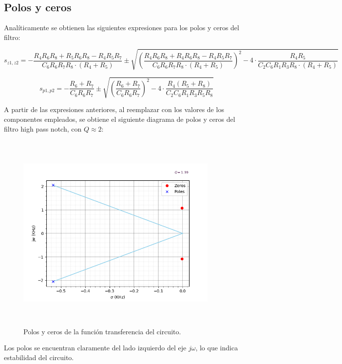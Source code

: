 \subsection{Polos y ceros}

Anal\'iticamente se obtienen las siguientes expresiones para los polos y ceros del filtro:

\begin{equation}
s_{z1,z2} = - \frac{R_4  R_6  R_8+R_5  R_6  R_8 - R_4 R_5 R_7}{C_6 R_6 R_7 R_8 \cdot (R_4 + R_5)} \pm \sqrt{\left( \frac{R_4 R_6 R_8 + R_4 R_6 R_8 - R_4 R_5 R_7}{C_6 R_6 R_7 R_8 \cdot (R_4 + R_5)}\right)^2- 4 \cdot \frac{R_4 R_5}{C_2 C_6 R_1 R_3 R_8 \cdot (R_4 + R_5)}}
\label{ceros}
\end{equation}

\begin{equation}
s_{p1,p2} = - \frac{R_6 + R_7}{C_6 R_6 R_7} \pm \sqrt{\left( \frac{R_6 + R_7}{C_6 R_6 R_7}\right)^2 - 4 \cdot \frac{R_4(R_5+R_8)}{C_2 C_6 R_1 R_3 R_5 R_8}}
\label{polos}
\end{equation}


A partir de las expresiones anteriores, al reemplazar con los valores de los componentes empleados, se obtiene el siguiente diagrama de polos y ceros del filtro high pass notch, con $Q\approx 2$:

\begin{figure}[H] %
	\centering
	\includegraphics[width=10cm,height=10cm,keepaspectratio]{../EJ1/00GRAFICOS/singularidades.png}
	\caption{Polos y ceros de la funci\'on transferencia del circuito.}
	\label{c1vinmax}
\end{figure}

Los polos se encuentran claramente del lado izquierdo del eje $j\omega$, lo que indica estabilidad del circuito.





